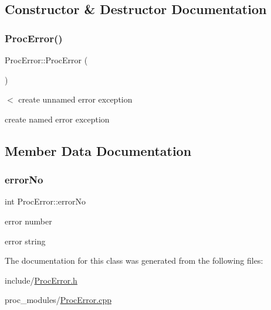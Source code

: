 \subsection{Constructor \& Destructor Documentation}
\mbox{\label{classProcError_af2f56765e672178cba7f8105bd3347eb}} 
\subsubsection{\texorpdfstring{Proc\+Error()}{ProcError()}}
{\footnotesize\ttfamily Proc\+Error\+::\+Proc\+Error (\begin{DoxyParamCaption}{ }\end{DoxyParamCaption})\hspace{0.3cm}{\ttfamily [inline]}}



$<$ create unnamed error exception 

create named error exception 

\subsection{Member Data Documentation}
\mbox{\label{classProcError_a0bd2a883852f733b07b6b896f5a51d0c}} 
\subsubsection{\texorpdfstring{error\+No}{errorNo}}
{\footnotesize\ttfamily int Proc\+Error\+::error\+No\hspace{0.3cm}{\ttfamily [protected]}}



error number 

error string 

The documentation for this class was generated from the following files\+:\begin{DoxyCompactItemize}
\item 
include/\hyperlink{ProcError_8h}{Proc\+Error.\+h}\item 
proc\+\_\+modules/\hyperlink{ProcError_8cpp}{Proc\+Error.\+cpp}\end{DoxyCompactItemize}
